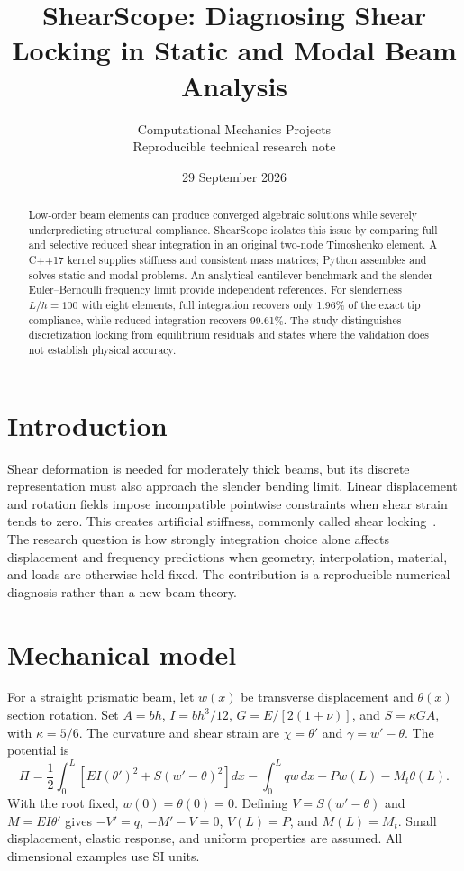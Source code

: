 \documentclass[10pt,a4paper]{article}
\title{\vspace{-1.3cm}\LARGE ShearScope: Diagnosing Shear Locking in Static and Modal Beam Analysis}
\author{\small Computational Mechanics Projects\\\small Reproducible technical research note}
\date{\small 29 September 2026}
\begin{document}
\maketitle\thispagestyle{fancy}

\begin{abstract}
Low-order beam elements can produce converged algebraic solutions while severely underpredicting structural compliance. ShearScope isolates this issue by comparing full and selective reduced shear integration in an original two-node Timoshenko element. A C++17 kernel supplies stiffness and consistent mass matrices; Python assembles and solves static and modal problems. An analytical cantilever benchmark and the slender Euler--Bernoulli frequency limit provide independent references. For slenderness $L/h=100$ with eight elements, full integration recovers only 1.96\% of the exact tip compliance, while reduced integration recovers 99.61\%. The study distinguishes discretization locking from equilibrium residuals and states where the validation does not establish physical accuracy.
\end{abstract}
\section{Introduction}
Shear deformation is needed for moderately thick beams, but its discrete representation must also approach the slender bending limit. Linear displacement and rotation fields impose incompatible pointwise constraints when shear strain tends to zero. This creates artificial stiffness, commonly called shear locking~\cite{delft}. The research question is how strongly integration choice alone affects displacement and frequency predictions when geometry, interpolation, material, and loads are otherwise held fixed. The contribution is a reproducible numerical diagnosis rather than a new beam theory.
\section{Mechanical model}
For a straight prismatic beam, let $w(x)$ be transverse displacement and $\theta(x)$ section rotation. Set $A=bh$, $I=bh^3/12$, $G=E/[2(1+\nu)]$, and $S=\kappa GA$, with $\kappa=5/6$. The curvature and shear strain are $\chi=\theta'$ and $\gamma=w'-\theta$. The potential is
\begin{equation}
\Pi=\frac12\int_0^L\!\left[EI(\theta')^2+S(w'-\theta)^2\right]dx
-\int_0^L qw\,dx-Pw(L)-M_t\theta(L).
\end{equation}
With the root fixed, $w(0)=\theta(0)=0$. Defining $V=S(w'-\theta)$ and $M=EI\theta'$ gives $-V'=q$, $-M'-V=0$, $V(L)=P$, and $M(L)=M_t$. Small displacement, elastic response, and uniform properties are assumed. All dimensional examples use SI units.
\end{document}
